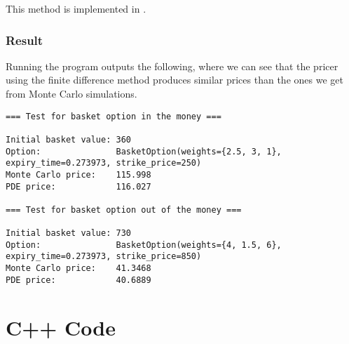 \documentclass[english]{article}
\numberwithin{equation}{section}
\numberwithin{figure}{section}
\theoremstyle{bolddescit}
\theoremstyle{definition}
\theoremstyle{definition}
\theoremstyle{plain}
\theoremstyle{plain}
\theoremstyle{bolddesc}
\theoremstyle{plain}
\theoremstyle{remark}
\begin{document}
This method is implemented in .

\subsubsection{Result}

Running the program outputs the following, where we can see that the pricer using the finite difference method produces similar prices than the ones we get from Monte Carlo simulations.

{\scriptsize
\begin{verbatim}
=== Test for basket option in the money ===

Initial basket value: 360
Option:               BasketOption(weights={2.5, 3, 1}, expiry_time=0.273973, strike_price=250)
Monte Carlo price:    115.998
PDE price:            116.027

=== Test for basket option out of the money ===

Initial basket value: 730
Option:               BasketOption(weights={4, 1.5, 6}, expiry_time=0.273973, strike_price=850)
Monte Carlo price:    41.3468
PDE price:            40.6889
\end{verbatim}
}

\pagebreak
\appendix

\section*{C++ Code}


\needspace{10cm}

\needspace{10cm}

\needspace{10cm}


\pagebreak
\printbibliography
\end{document}
